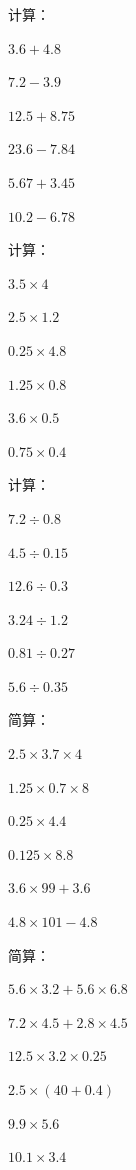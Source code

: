 \documentclass[a4paper,12pt]{ctexart}
\begin{document}
\begin{exercise}
\item 计算：
  \begin{subexercise}
    \item $3.6+4.8$
    \item $7.2-3.9$
    \item $12.5+8.75$
    \item $23.6-7.84$
    \item $5.67+3.45$
    \item $10.2-6.78$
  \end{subexercise}

\item 计算：
  \begin{subexercise}
    \item $3.5\times4$
    \item $2.5\times1.2$
    \item $0.25\times4.8$
    \item $1.25\times0.8$
    \item $3.6\times0.5$
    \item $0.75\times0.4$
  \end{subexercise}

\item 计算：
  \begin{subexercise}
    \item $7.2\div0.8$
    \item $4.5\div0.15$
    \item $12.6\div0.3$
    \item $3.24\div1.2$
    \item $0.81\div0.27$
    \item $5.6\div0.35$
  \end{subexercise}

\item 简算：
  \begin{subexercise}
    \item $2.5\times3.7\times4$
    \item $1.25\times0.7\times8$
    \item $0.25\times4.4$
    \item $0.125\times8.8$
    \item $3.6\times99+3.6$
    \item $4.8\times101-4.8$
  \end{subexercise}

\item 简算：
  \begin{subexercise}
    \item $5.6\times3.2+5.6\times6.8$
    \item $7.2\times4.5+2.8\times4.5$
    \item $12.5\times3.2\times0.25$
    \item $2.5\times(40+0.4)$
    \item $9.9\times5.6$
    \item $10.1\times3.4$
  \end{subexercise}


\end{exercise}
\end{document}
